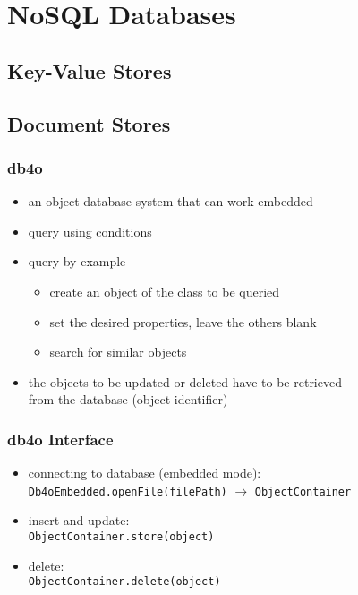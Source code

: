 \documentclass[dvipsnames]{beamer}
\theoremstyle{plain}
\begin{document}
\section{NoSQL Databases}

\subsection{Key-Value Stores}

\subsection{Document Stores}

\begin{frame}
  \frametitle{db4o}

  \begin{itemize}
    \item an object database system that can work embedded

    \pause
    \medskip
    \item query using conditions
    \item query by example
    \begin{itemize}
      \item create an object of the class to be queried
      \item set the desired properties, leave the others blank
      \item search for similar objects
    \end{itemize}

    \pause
    \medskip
    \item the objects to be updated or deleted have to be retrieved\\
      from the database (object identifier)
  \end{itemize}
\end{frame}

\begin{frame}
  \frametitle{db4o Interface}

  \begin{itemize}
    \item connecting to database (embedded mode):\\
      \lstinline!Db4oEmbedded.openFile(filePath)!
        $\rightarrow$ \lstinline!ObjectContainer!

    \pause
    \medskip
    \item insert and update:\\
      \lstinline!ObjectContainer.store(object)!
    \item delete:\\
      \lstinline!ObjectContainer.delete(object)!
  \end{itemize}
\end{frame}
\end{document}
